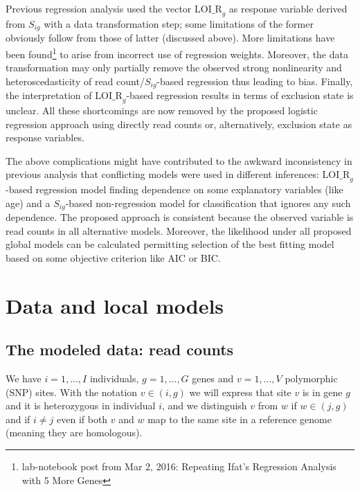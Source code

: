 \documentclass[letterpaper]{article}
\begin{document}
Previous regression analysis used the vector \(\mathrm{LOI\_R}_g\) as response variable
derived from \(S_{ig}\) with a data transformation step; some limitations of the former obviously follow from those of latter
(discussed above).  More limitations have been found\footnote{lab-notebook post
from Mar 2, 2016: Repeating Ifat's Regression Analysis with 5
More Genes} to arise from incorrect use of regression
weights.  Moreover, the data transformation may only partially remove
the observed strong nonlinearity and heteroscedasticity of read
count/\(S_{ig}\)-based regression thus leading to bias.  Finally, the
interpretation of \(\mathrm{LOI\_R}_g\)-based regression results in terms of
exclusion state is unclear.  All these shortcomings are now removed by the
proposed logistic regression approach using directly read counts or, alternatively,
exclusion state as response variables.

The above complications might have contributed to the awkward inconsistency in
previous analysis
that conflicting models were used in different inferences:
\(\mathrm{LOI\_R}_g\)-based regression model finding dependence on some explanatory
variables (like age) and a \(S_{ig}\)-based non-regression model for
classification that ignores any such dependence.  The proposed 
approach is consistent because the observed variable is read counts in all
alternative models.  Moreover, the likelihood under all proposed global models can
be calculated permitting selection of the best fitting model based on
some objective criterion like AIC or BIC.

\section{Data and local models}

\subsection{The modeled data: read counts}

We have \(i=1,...,I\) individuals, \(g=1,...,G\) genes and \(v=1,...,V\)
polymorphic (SNP) sites.  With the notation \(v\in(i,g)\) we will express that site \(v\) is in
gene \(g\) and it is heterozygous in individual \(i\), and we distinguish \(v\)
from \(w\) if \(w\in(j,g)\) and if \(i\neq j\) even if both \(v\) and \(w\) map to
the same site in a reference genome (meaning they are homologous).
\end{document}
